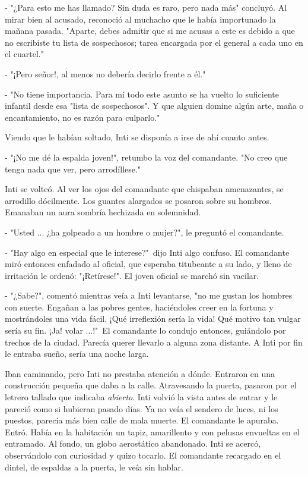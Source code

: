 - "¿Para esto me has llamado? Sin duda es raro, pero nada más" concluyó. Al mirar bien al acusado, reconoció al muchacho que le había importunado la mañana pasada. "Aparte, debes admitir que si me acusas a este es debido a que no escribiste tu lista de sospechosos; tarea encargada por el general a cada uno en el cuartel."

- "¡Pero señor!, al menos no debería decirlo frente a él."

- "No tiene importancia. Para mí todo este asunto se ha vuelto lo suficiente infantil desde esa "lista de sospechosos". Y que alguien domine algún arte, maña o encantamiento, no es razón para culparlo."

Viendo que le habían soltado, Inti se disponía a irse de ahí cuanto antes.

- "¡No me dé la espalda joven!", retumbo la voz del comandante. "No creo que tenga nada que ver, pero arrodíllese."

Inti se volteó. Al ver los ojos del comandante que chispaban amenazantes, se arrodillo dócilmente. Los guantes alargados se posaron sobre su hombros. Emanaban un aura sombría hechizada en solemnidad.

- "Usted ... ¿ha golpeado a un hombre o mujer?", le preguntó el comandante.

- "Hay algo en especial que le interese?"\, dijo Inti algo confuso. El comandante miró entonces enfadado al oficial, que esperaba titubeante a su lado, y lleno de irritación le ordenó: "¡Retírese!". El joven oficial se marchó sin vacilar.

- "¿Sabe?", comentó mientras veía a Inti levantarse, "no me gustan los hombres con suerte. Engañan a las pobres gentes, haciéndoles creer en la fortuna y mostrándoles una vida fácil. ¡Qué irreflexión sería la vida! Qué motivo tan vulgar sería su fin. ¡Ja! volar ...!"\, El comandante lo condujo entonces, guiándolo por trechos de la ciudad. Parecía querer llevarlo a alguna zona distante. A Inti por fin le entraba sueño, sería una noche larga.



\chpater{------}
Iban caminando, pero Inti no prestaba atención a dónde. Entraron en una construcción pequeña que daba a la calle. Atravesando la puerta, pasaron por el letrero tallado que indicaba \emph{abierto}. Inti volvió la vista antes de entrar y le pareció como si hubieran pasado días. Ya no veía el sendero de luces, ni los puestos, parecía más bien calle de mala muerte. El comandante le apuraba. Entró. Había en la habitación un tapiz, amarillento y con pelusas envueltas en el entramado. Al fondo, un globo aerostático abandonado. Inti se acercó, observándolo con curiosidad y quizo tocarlo. El comandante recargado en el dintel, de espaldas a la puerta, le veía sin hablar.

